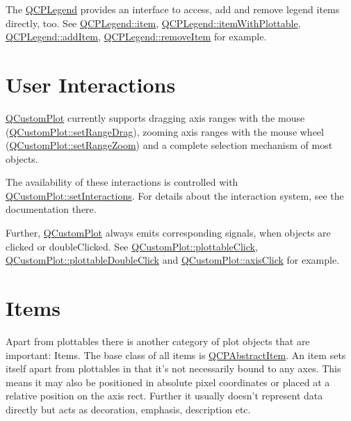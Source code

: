 The \hyperlink{classQCPLegend}{Q\-C\-P\-Legend} provides an interface to access, add and remove legend items directly, too. See \hyperlink{classQCPLegend_a454272d7094437beb3278a2294006da5}{Q\-C\-P\-Legend\-::item}, \hyperlink{classQCPLegend_a5ee80cf83f65e3b6dd386942ee3cc1ee}{Q\-C\-P\-Legend\-::item\-With\-Plottable}, \hyperlink{classQCPLegend_a3ab274de52d2951faea45a6d975e6b3f}{Q\-C\-P\-Legend\-::add\-Item}, \hyperlink{classQCPLegend_ac91595c3eaa746fe6321d2eb952c63bb}{Q\-C\-P\-Legend\-::remove\-Item} for example.\hypertarget{index_userinteraction}{}\section{User Interactions}\label{index_userinteraction}
\hyperlink{classQCustomPlot}{Q\-Custom\-Plot} currently supports dragging axis ranges with the mouse (\hyperlink{classQCustomPlot_aa0e1c44295da2706d0f12ad48f64b806}{Q\-Custom\-Plot\-::set\-Range\-Drag}), zooming axis ranges with the mouse wheel (\hyperlink{classQCustomPlot_ad4a0919e471549a2daea517ce6538ad8}{Q\-Custom\-Plot\-::set\-Range\-Zoom}) and a complete selection mechanism of most objects.

The availability of these interactions is controlled with \hyperlink{classQCustomPlot_add9cc886ff5257f64fb4117cf6c135fe}{Q\-Custom\-Plot\-::set\-Interactions}. For details about the interaction system, see the documentation there.

Further, \hyperlink{classQCustomPlot}{Q\-Custom\-Plot} always emits corresponding signals, when objects are clicked or double\-Clicked. See \hyperlink{classQCustomPlot_a57e5efa8a854620e9bf62d31fc139f53}{Q\-Custom\-Plot\-::plottable\-Click}, \hyperlink{classQCustomPlot_af2e6f1cea923dae437681d01ce7d0c31}{Q\-Custom\-Plot\-::plottable\-Double\-Click} and \hyperlink{classQCustomPlot_abf635f8b56ab5c16d5de9f358543e82b}{Q\-Custom\-Plot\-::axis\-Click} for example.\hypertarget{index_items}{}\section{Items}\label{index_items}
Apart from plottables there is another category of plot objects that are important\-: Items. The base class of all items is \hyperlink{classQCPAbstractItem}{Q\-C\-P\-Abstract\-Item}. An item sets itself apart from plottables in that it's not necessarily bound to any axes. This means it may also be positioned in absolute pixel coordinates or placed at a relative position on the axis rect. Further it usually doesn't represent data directly but acts as decoration, emphasis, description etc.

